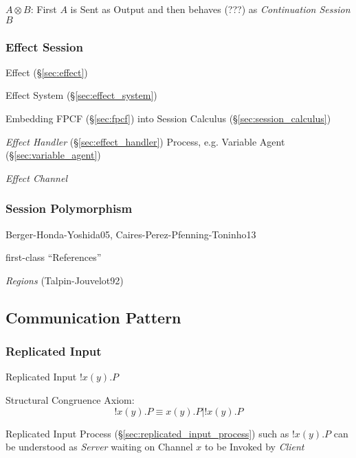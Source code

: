 $A \otimes B$: First $A$ is Sent as Output and then behaves (???) as
\emph{Continuation Session} $B$



\subsubsection{Effect Session}\label{sec:effect_session}

\cite{orchard-yoshida16}

Effect (\S\ref{sec:effect})

Effect System (\S\ref{sec:effect_system})

Embedding FPCF (\S\ref{sec:fpcf}) into Session Calculus
(\S\ref{sec:session_calculus})

\emph{Effect Handler} (\S\ref{sec:effect_handler}) Process, e.g.
Variable Agent (\S\ref{sec:variable_agent})

\emph{Effect Channel}



\subsubsection{Session Polymorphism}\label{sec:session_polymorphism}


Berger-Honda-Yoshida05, Caires-Perez-Pfenning-Toninho13

first-class ``References'' \cite{orchard-yoshida16}

\emph{Regions} (Talpin-Jouvelot92)



\subsection{Communication Pattern}\label{sec:communication_pattern}

\subsubsection{Replicated Input}\label{sec:replicated_input}

Replicated Input $!x(y).P$

Structural Congruence Axiom:
\[
  !x(y).P \equiv x(y).P | !x(y).P
\]

Replicated Input Process (\S\ref{sec:replicated_input_process}) such
as $!x(y).P$ can be understood as \emph{Server} waiting on Channel $x$
to be Invoked by \emph{Client}



